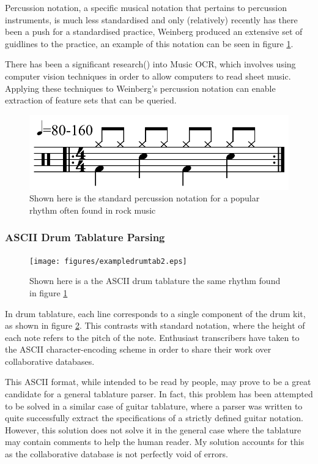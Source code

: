 \documentclass[12pt,twoside,notitlepage]{report}
\begin{document}
		Percussion notation, a specific musical notation that pertains to percussion instruments, is much less standardised and only (relatively) recently has there been a push for a standardised practice, Weinberg produced an extensive set of guidlines to the practice\cite{Weinberg1994}, an example of this notation can be seen in figure \ref{PercussionNotation}.
		
		There has been a significant research(\cite{Johansen2009}\cite{BainbridgeBell2001}) into Music OCR\footnotemark {}, which involves using computer vision techniques in order to allow computers to read sheet music. Applying these techniques to Weinberg's percussion notation can enable extraction of feature sets that can be queried.
		\begin{figure}[h]
			\centerline{\includegraphics[scale=0.5]{figures/Characteristic_rock_drum_pattern.png}}
			\caption{\label{PercussionNotation} Shown here is the standard percussion notation for a popular rhythm often found in rock music}
\end{figure}
			\subsubsection{ASCII Drum Tablature Parsing}
						\begin{figure}[h]
			\centerline{\texttt{[image: figures/exampledrumtab2.eps]}}
			\caption{\label{DrumTablature} Shown here is a the ASCII drum tablature the same rhythm found in figure \ref{PercussionNotation}}
\end{figure}
				In drum tablature, each line corresponds to a single component of the drum kit, as shown in figure \ref{DrumTablature}. This contrasts with standard notation, where the height of each note refers to the pitch of the note. Enthusiast transcribers have taken to the ASCII character-encoding scheme in order to share their work over collaborative databases\footnotemark {}.
				
				This ASCII format, while intended to be read by people, may prove to be a great candidate for a general tablature parser. In fact, this problem has been attempted to be solved in a similar case of guitar tablature\cite{Knowles2013}, where a parser was written to quite successfully extract the specifications of a strictly defined guitar notation. However, this solution does not solve it in the general case where the tablature may contain comments to help the human reader. My solution accounts for this as the collaborative database is not perfectly void of errors.
\end{document}
